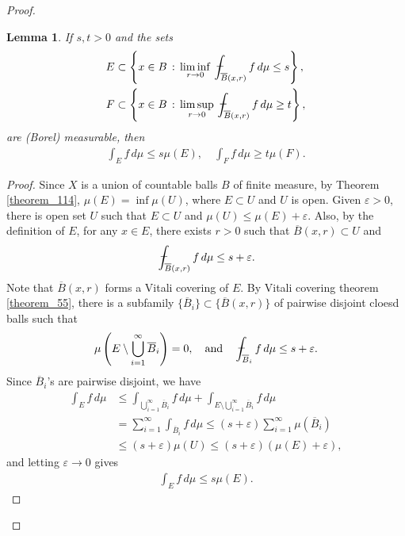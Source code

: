 \documentclass[11pt]{book}
\newtheorem{lemma}{Lemma}[chapter]
\theoremstyle{definition}
\numberwithin{equation}{chapter}
\def\avint{\,\ThisStyle{\ensurestackMath{%
  \stackinset{c}{.2\LMpt}{c}{1\LMpt}{\SavedStyle-}{\SavedStyle\phantom{\int}}}%
  \setbox0=\hbox{$\SavedStyle\int\,$}\kern-\wd0}\int}
\begin{document}
\begin{proof}
\begin{lemma}\label{lemma_61}
If $s,t > 0$ and the sets
\begin{align*}
    E & \subset \left\{x \in B \,:\, \liminf_{r \to 0} \avint_{\overline{B}(x,r)} f\,d\mu \leq s\right\}, \\
    F & \subset \left\{x \in B \,:\, \limsup_{r \to 0} \avint_{\overline{B}(x,r)} f\,d\mu \geq t\right\},
\end{align*}
are (Borel) measurable, then 
\begin{align*}
    \int_E f\,d\mu \leq s \mu(E), \quad \int_F f\,d\mu \geq t \mu(F).
\end{align*}
\end{lemma}
\begin{proof}
Since $X$ is a union of countable balls $B$ of finite measure, by Theorem \ref{theorem_114}, $\mu(E) = \inf \mu(U)$, where $E \subset U$ and $U$ is open. Given $\varepsilon > 0$, there is open set $U$ such that $E \subset U$ and $\mu(U) \leq \mu(E) + \varepsilon$. Also, by the definition of $E$, for any $x \in E$, there exists $r > 0$ such that $\overline{B}(x,r) \subset U$ and
\begin{align*}
    \avint_{\overline{B}(x,r)} f\,d\mu \leq s + \varepsilon.
\end{align*}
Note that $\overline{B}(x,r)$ forms a Vitali covering of $E$. By Vitali covering theorem \ref{theorem_55}, there is a subfamily $\{\overline{B}_i\} \subset \{\overline{B}(x,r)\}$ of pairwise disjoint cloesd balls such that 
\begin{align*}
    \mu\left(E \setminus \bigcup^\infty_{i=1} \overline{B}_i\right) = 0, \quad \text{and} \quad \avint_{\overline{B}_i} f\,d\mu \leq s + \varepsilon.
\end{align*}
Since $\overline{B}_i$'s are pairwise disjoint, we have
\begin{align*}
    \int_E f\,d\mu & \leq \int_{\bigcup^\infty_{i=1} \overline{B}_i} f\,d\mu + \int_{E \setminus \bigcup^\infty_{i=1} \overline{B}_i} f\,d\mu \\
    & = \sum^\infty_{i=1} \int_{\overline{B}_i} f\,d\mu \leq (s + \varepsilon) \sum^\infty_{i=1} \mu (\overline{B}_i) \\
    & \leq (s + \varepsilon) \mu(U) \leq (s + \varepsilon) (\mu(E) + \varepsilon),
\end{align*}
and letting $\varepsilon \to 0$ gives
\begin{align*}
    \int_E f\,d\mu \leq s \mu(E).
\end{align*}


\end{proof}
\end{proof}
\end{document}
